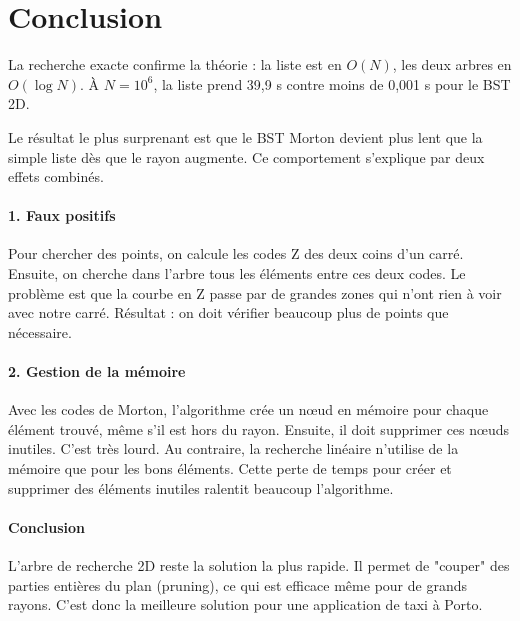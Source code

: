 \section{Conclusion}

La recherche exacte confirme la théorie : la liste est en $O(N)$, les deux
arbres en $O(\log N)$. À $N=10^6$, la liste prend 39{,}9 s contre moins de
0{,}001 s pour le BST 2D.

Le résultat le plus surprenant est que le BST Morton devient plus lent
que la simple liste dès que le rayon augmente.
Ce comportement s'explique par deux effets combinés.

\paragraph{1. Faux positifs}
Pour chercher des points, on calcule les codes Z des deux coins d'un carré.
Ensuite, on cherche dans l'arbre tous les éléments entre ces deux codes.
Le problème est que la courbe en Z passe par de grandes zones qui n'ont rien à voir avec notre carré.
Résultat : on doit vérifier beaucoup plus de points que nécessaire.

\paragraph{2. Gestion de la mémoire}
Avec les codes de Morton, l'algorithme crée un nœud en mémoire pour chaque élément trouvé, même s'il est hors du rayon.
Ensuite, il doit supprimer ces nœuds inutiles. C'est très lourd.
Au contraire, la recherche linéaire n'utilise de la mémoire que pour les bons éléments.
Cette perte de temps pour créer et supprimer des éléments inutiles ralentit beaucoup l'algorithme.

\paragraph{Conclusion}

L'arbre de recherche 2D reste la solution la plus rapide.
Il permet de "couper" des parties entières du plan (pruning), ce qui est efficace même pour de grands rayons.
C’est donc la meilleure solution pour une application de taxi à Porto.
